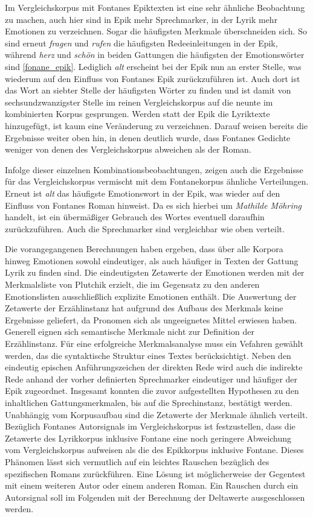 \documentclass[a4paper,10p]{article}
\begin{document}
Im Vergleichskorpus mit Fontanes Epiktexten ist eine sehr ähnliche Beobachtung zu machen, auch hier sind in Epik mehr Sprechmarker, in der Lyrik mehr Emotionen zu verzeichnen. Sogar die häufigsten Merkmale überschneiden sich. So sind erneut \textit{fragen} und \textit{rufen} die häufigsten Redeeinleitungen in der Epik, während \textit{herz} und \textit{schön} in beiden Gattungen die häufigsten der Emotionswörter sind \ref{fonane_epik}. Lediglich \textit{alt} erscheint bei der Epik nun an erster Stelle, was wiederum auf den Einfluss von Fontanes Epik zurückzuführen ist. Auch dort ist das Wort an siebter Stelle der häufigsten Wörter zu finden und ist damit von sechsundzwanzigster Stelle im reinen Vergleichskorpus auf die neunte im kombinierten Korpus gesprungen. Werden statt der Epik die Lyriktexte hinzugefügt, ist kaum eine Veränderung zu verzeichnen. Darauf weisen bereits die Ergebnisse weiter oben hin, in denen deutlich wurde, dass Fontanes Gedichte weniger von denen des Vergleichskorpus abweichen als der Roman. \par 

Infolge dieser einzelnen Kombinationsbeobachtungen, zeigen auch die Ergebnisse für das Vergleichskorpus vermischt mit dem Fontanekorpus ähnliche Verteilungen. Erneut ist \textit{alt} das häufigste Emotionswort in der Epik, was wieder auf den Einfluss von Fontanes Roman hinweist. Da es sich hierbei um \textit{Mathilde Möhring} handelt, ist ein übermäßiger Gebrauch des Wortes eventuell daraufhin zurückzuführen. Auch die Sprechmarker sind vergleichbar wie oben verteilt. \par 

Die vorangegangenen Berechnungen haben ergeben, dass über alle Korpora hinweg Emotionen sowohl eindeutiger, als auch häufiger in Texten der Gattung Lyrik zu finden sind. Die eindeutigsten Zetawerte der Emotionen werden mit der Merkmalsliste von Plutchik erzielt, die im Gegensatz zu den anderen Emotionslisten ausschließlich explizite Emotionen enthält. Die Auswertung der Zetawerte der Erzählinstanz hat aufgrund des Aufbaus des Merkmals keine Ergebnisse geliefert, da Pronomen sich als ungeeignetes Mittel erwiesen haben. Generell eignen sich semantische Merkmale nicht zur Definition der Erzählinstanz. Für eine erfolgreiche Merkmalsanalyse muss ein Vefahren gewählt werden, das die syntaktische Struktur eines Textes berücksichtigt. Neben den eindeutig epischen Anführungszeichen der direkten Rede wird auch die indirekte Rede anhand der vorher definierten Sprechmarker eindeutiger und häufiger der Epik zugeordnet. Insgesamt konnten die zuvor aufgestellten Hypothesen zu den inhaltlichen Gattungsmerkmalen, bis auf die Sprechinstanz, bestätigt werden. Unabhängig vom Korpusaufbau sind die Zetawerte der Merkmale ähnlich verteilt. Bezüglich Fontanes Autorsignals im Vergleichskorpus ist festzustellen, dass die Zetawerte des Lyrikkorpus inklusive Fontane eine noch geringere Abweichung vom Vergleichskorpus aufweisen als die des Epikkorpus inklusive Fontane. Dieses Phänomen lässt sich vermutlich auf ein leichtes Rauschen bezüglich des spezifischen Romans zurückführen. Eine Lösung ist möglicherweise der Gegentest mit einem weiteren Autor oder einem anderen Roman. Ein Rauschen durch ein Autorsignal soll im Folgenden mit der Berechnung der Deltawerte ausgeschlossen werden.
\end{document}
